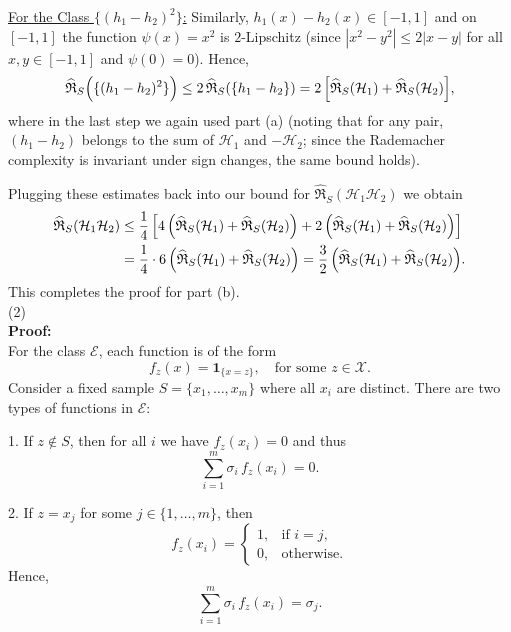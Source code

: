\documentclass[letterpaper, 11pt]{article}
\newcommand{\1}{\mathds{1}}	%
\theoremstyle{definition}
\begin{document}
\medskip

\underline{For the Class \(\{(h_1-h_2)^2\}\):}  
Similarly, \(h_1(x)-h_2(x)\in[-1,1]\) and on \([-1,1]\) the function \(\psi(x)=x^2\) is \(2\)-Lipschitz (since \(|x^2-y^2|\le 2|x-y|\) for all \(x,y\in[-1,1]\) and \(\psi(0)=0\)). Hence,
\[
\widehat{\mathfrak{R}}_S\Bigl(\{(h_1-h_2)^2\}\Bigr)
\le 2\,\widehat{\mathfrak{R}}_S(\{h_1-h_2\})
= 2\,\Bigl[\widehat{\mathfrak{R}}_S(\mathcal{H}_1)
+\widehat{\mathfrak{R}}_S(\mathcal{H}_2)\Bigr],
\]
where in the last step we again used part (a) (noting that for any pair, \((h_1-h_2)\) belongs to the sum of \(\mathcal{H}_1\) and \(-\mathcal{H}_2\); since the Rademacher complexity is invariant under sign changes, the same bound holds).

\medskip

Plugging these estimates back into our bound for \(\widehat{\mathfrak{R}}_S(\mathcal{H}_1\mathcal{H}_2)\) we obtain
\[
\begin{aligned}
\widehat{\mathfrak{R}}_S(\mathcal{H}_1\mathcal{H}_2)
&\le \frac{1}{4}\left[
4\,\Bigl(\widehat{\mathfrak{R}}_S(\mathcal{H}_1)
+\widehat{\mathfrak{R}}_S(\mathcal{H}_2)\Bigr)
+ 2\,\Bigl(\widehat{\mathfrak{R}}_S(\mathcal{H}_1)
+\widehat{\mathfrak{R}}_S(\mathcal{H}_2)\Bigr)
\right] \\
&=\frac{1}{4}\cdot 6\,\Bigl(\widehat{\mathfrak{R}}_S(\mathcal{H}_1)
+\widehat{\mathfrak{R}}_S(\mathcal{H}_2)\Bigr)
=\frac{3}{2}\,\Bigl(\widehat{\mathfrak{R}}_S(\mathcal{H}_1)
+\widehat{\mathfrak{R}}_S(\mathcal{H}_2)\Bigr).
\end{aligned}
\]
This completes the proof for part (b).\\
(2)
\\\textbf{Proof:}\\[1mm]
For the class \(\mathcal{E}\), each function is of the form
\[
f_z(x)=\mathbf{1}_{\{x=z\}},\quad \text{for some } z\in\mathcal{X}.
\]
Consider a fixed sample \(S=\{x_1,\dots,x_m\}\) where all \(x_i\) are distinct. There are two types of functions in \(\mathcal{E}\):
  
1. If \(z\notin S\), then for all \(i\) we have \(f_z(x_i)=0\) and thus 
\[
\sum_{i=1}^{m}\sigma_i\,f_z(x_i)=0.
\]
  
2. If \(z=x_j\) for some \(j\in\{1,\dots,m\}\), then
\[
f_z(x_i)= \begin{cases} 1, &\text{if }i=j,\\ 0,& \text{otherwise.} \end{cases}
\]
Hence,
\[
\sum_{i=1}^m \sigma_i\,f_z(x_i)=\sigma_j.
\]
\end{document}
